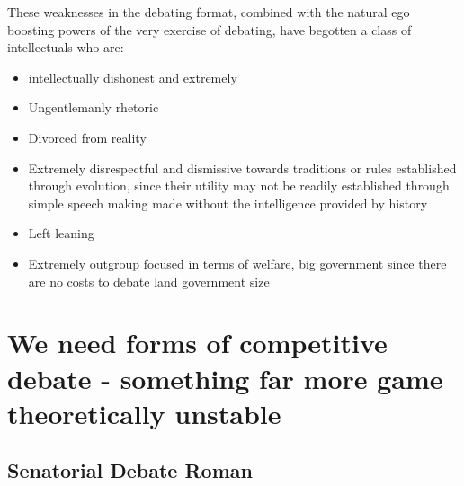 These weaknesses in the debating format, combined with the natural ego boosting powers of the very exercise of debating, have begotten a class of intellectuals who are:

\begin{itemize}
    \item intellectually dishonest and extremely
    \item Ungentlemanly rhetoric
    \item Divorced from reality
    \item Extremely disrespectful and dismissive towards traditions or rules established through evolution, since their utility may not be readily established through simple speech making made without the intelligence provided by history
    \item Left leaning
    \item Extremely outgroup focused in terms of welfare, big government since there are no costs to debate land government size
\end{itemize}

\section{We need forms of competitive debate - something far more game theoretically unstable}

\subsection{Senatorial Debate Roman}

